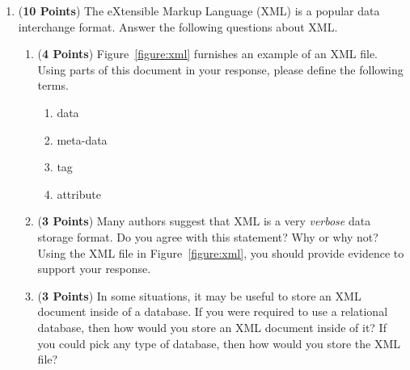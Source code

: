 \documentclass[12pt]{article}
\begin{document}
\begin{enumerate}
\newpage

\item ({\bf 10 Points}) The eXtensible Markup Language (XML) is a
  popular data interchange format.  Answer the following questions
  about XML.

  \begin{enumerate}
    
    \item ({\bf 4 Points}) Figure~\ref{figure:xml} furnishes an
      example of an XML file.  Using parts of this document in your
      response, please define the following terms.

      \begin{enumerate}

        \item data

        \item meta-data

        \item tag

        \item attribute

      \end{enumerate}

  \item ({\bf 3 Points}) Many authors suggest that XML is a very {\em
    verbose} data storage format.  Do you agree with this statement?
    Why or why not? Using the XML file in Figure~\ref{figure:xml}, you
    should provide evidence to support your response.

  \item ({\bf 3 Points}) In some situations, it may be useful to store
    an XML document inside of a database.  If you were required to use
    a relational database, then how would you store an XML document
    inside of it?  If you could pick any type of database, then how
    would you store the XML file?

  \end{enumerate}


    


\end{enumerate}
\end{document}
